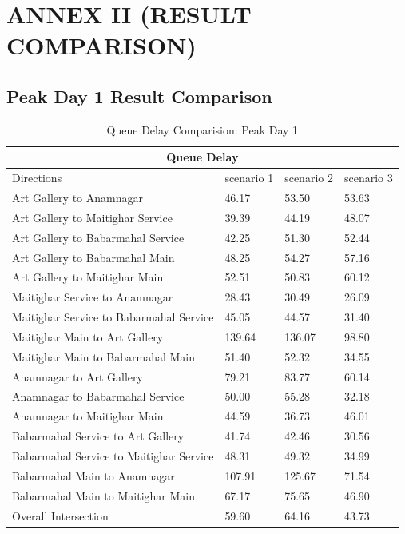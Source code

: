 \chapter{ANNEX II (RESULT COMPARISON) }

\section{Peak Day 1 Result Comparison}

\begin{table}[h!]
    \centering
    \caption{Queue Delay Comparision: Peak Day 1}
    \begin{tabular}{|l|l|l|l|}

        \hline
        \multicolumn{4}{|c|}{\textbf{Queue Delay}} \\
        \hline
        Directions &	scenario 1 &	scenario 2 &	scenario 3 \\
        \hline
        Art Gallery to  Anamnagar	& 46.17	& 53.50	& 53.63 \\
        \hline
        Art Gallery to Maitighar Service &	39.39	& 44.19	& 48.07 \\
        \hline
        Art Gallery to Babarmahal Service &	42.25	& 51.30	& 52.44 \\
        \hline
        Art Gallery to Babarmahal Main	& 48.25 &	54.27 &	57.16 \\
        \hline
        Art Gallery to  Maitighar Main &	52.51 &	50.83 &	60.12 \\
        \hline
        Maitighar Service to  Anamnagar &	28.43 &	30.49	& 26.09 \\
        \hline
        Maitighar Service to Babarmahal Service &	45.05 &	44.57	& 31.40 \\
        \hline
        Maitighar Main to Art Gallery &	139.64	& 136.07	& 98.80 \\
        \hline
        Maitighar Main to Babarmahal Main	& 51.40	& 52.32	& 34.55 \\
        \hline
        Anamnagar to Art Gallery &	79.21 &	83.77 &	60.14 \\
        \hline
        Anamnagar to  Babarmahal Service &	50.00 &	55.28 &	32.18 \\
        \hline
        Anamnagar to Maitighar Main &	44.59 &	36.73 &	46.01 \\
        \hline
        Babarmahal Service to  Art Gallery & 41.74 &	42.46 &	30.56 \\
        \hline
        Babarmahal Service  to Maitighar Service &	48.31 &	49.32 &	34.99 \\
        \hline
        Babarmahal Main to  Anamnagar &	107.91 &	125.67 &	71.54 \\
        \hline
        Babarmahal Main to Maitighar Main &	67.17 &	75.65 &	46.90 \\
        \hline
        Overall Intersection &	59.60 &	64.16 &	43.73 \\
        \hline


        
    \end{tabular}
\end{table}

